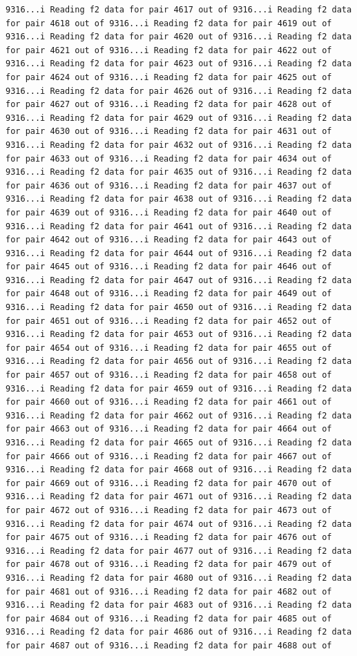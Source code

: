 \documentclass[
]{article}
\begin{document}
\begin{verbatim}
9316...i Reading f2 data for pair 4617 out of 9316...i Reading f2 data for pair 4618 out of 9316...i Reading f2 data for pair 4619 out of 9316...i Reading f2 data for pair 4620 out of 9316...i Reading f2 data for pair 4621 out of 9316...i Reading f2 data for pair 4622 out of 9316...i Reading f2 data for pair 4623 out of 9316...i Reading f2 data for pair 4624 out of 9316...i Reading f2 data for pair 4625 out of 9316...i Reading f2 data for pair 4626 out of 9316...i Reading f2 data for pair 4627 out of 9316...i Reading f2 data for pair 4628 out of 9316...i Reading f2 data for pair 4629 out of 9316...i Reading f2 data for pair 4630 out of 9316...i Reading f2 data for pair 4631 out of 9316...i Reading f2 data for pair 4632 out of 9316...i Reading f2 data for pair 4633 out of 9316...i Reading f2 data for pair 4634 out of 9316...i Reading f2 data for pair 4635 out of 9316...i Reading f2 data for pair 4636 out of 9316...i Reading f2 data for pair 4637 out of 9316...i Reading f2 data for pair 4638 out of 9316...i Reading f2 data for pair 4639 out of 9316...i Reading f2 data for pair 4640 out of 9316...i Reading f2 data for pair 4641 out of 9316...i Reading f2 data for pair 4642 out of 9316...i Reading f2 data for pair 4643 out of 9316...i Reading f2 data for pair 4644 out of 9316...i Reading f2 data for pair 4645 out of 9316...i Reading f2 data for pair 4646 out of 9316...i Reading f2 data for pair 4647 out of 9316...i Reading f2 data for pair 4648 out of 9316...i Reading f2 data for pair 4649 out of 9316...i Reading f2 data for pair 4650 out of 9316...i Reading f2 data for pair 4651 out of 9316...i Reading f2 data for pair 4652 out of 9316...i Reading f2 data for pair 4653 out of 9316...i Reading f2 data for pair 4654 out of 9316...i Reading f2 data for pair 4655 out of 9316...i Reading f2 data for pair 4656 out of 9316...i Reading f2 data for pair 4657 out of 9316...i Reading f2 data for pair 4658 out of 9316...i Reading f2 data for pair 4659 out of 9316...i Reading f2 data for pair 4660 out of 9316...i Reading f2 data for pair 4661 out of 9316...i Reading f2 data for pair 4662 out of 9316...i Reading f2 data for pair 4663 out of 9316...i Reading f2 data for pair 4664 out of 9316...i Reading f2 data for pair 4665 out of 9316...i Reading f2 data for pair 4666 out of 9316...i Reading f2 data for pair 4667 out of 9316...i Reading f2 data for pair 4668 out of 9316...i Reading f2 data for pair 4669 out of 9316...i Reading f2 data for pair 4670 out of 9316...i Reading f2 data for pair 4671 out of 9316...i Reading f2 data for pair 4672 out of 9316...i Reading f2 data for pair 4673 out of 9316...i Reading f2 data for pair 4674 out of 9316...i Reading f2 data for pair 4675 out of 9316...i Reading f2 data for pair 4676 out of 9316...i Reading f2 data for pair 4677 out of 9316...i Reading f2 data for pair 4678 out of 9316...i Reading f2 data for pair 4679 out of 9316...i Reading f2 data for pair 4680 out of 9316...i Reading f2 data for pair 4681 out of 9316...i Reading f2 data for pair 4682 out of 9316...i Reading f2 data for pair 4683 out of 9316...i Reading f2 data for pair 4684 out of 9316...i Reading f2 data for pair 4685 out of 9316...i Reading f2 data for pair 4686 out of 9316...i Reading f2 data for pair 4687 out of 9316...i Reading f2 data for pair 4688 out of 
\end{verbatim}
\end{document}
